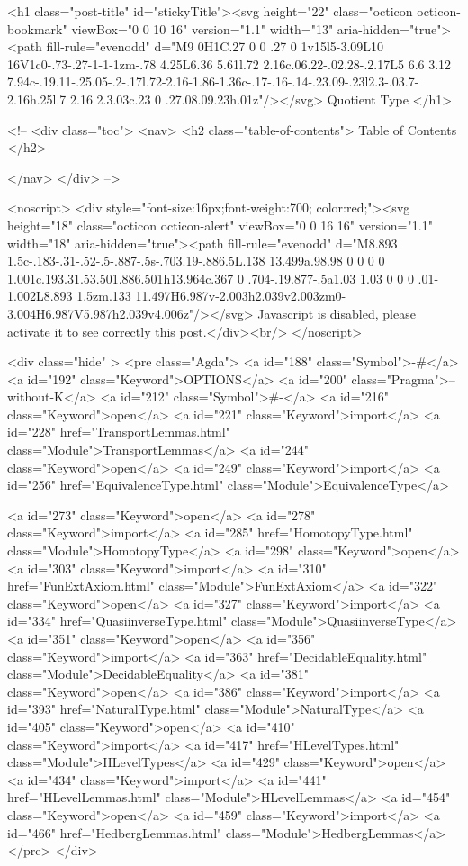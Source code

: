   <h1 class="post-title" id="stickyTitle"><svg height="22" class="octicon octicon-bookmark" viewBox="0 0 10 16" version="1.1" width="13" aria-hidden="true"><path fill-rule="evenodd" d="M9 0H1C.27 0 0 .27 0 1v15l5-3.09L10 16V1c0-.73-.27-1-1-1zm-.78 4.25L6.36 5.61l.72 2.16c.06.22-.02.28-.2.17L5 6.6 3.12 7.94c-.19.11-.25.05-.2-.17l.72-2.16-1.86-1.36c-.17-.16-.14-.23.09-.23l2.3-.03.7-2.16h.25l.7 2.16 2.3.03c.23 0 .27.08.09.23h.01z"/></svg> Quotient Type
  </h1>

  <!-- 
  <div class="toc">
    <nav>
    <h2 class="table-of-contents"> Table of Contents </h2>
      

    </nav>
  </div>
   -->

  <noscript>
  <div style="font-size:16px;font-weight:700; color:red;"><svg height="18" class="octicon octicon-alert" viewBox="0 0 16 16" version="1.1" width="18" aria-hidden="true"><path fill-rule="evenodd" d="M8.893 1.5c-.183-.31-.52-.5-.887-.5s-.703.19-.886.5L.138 13.499a.98.98 0 0 0 0 1.001c.193.31.53.501.886.501h13.964c.367 0 .704-.19.877-.5a1.03 1.03 0 0 0 .01-1.002L8.893 1.5zm.133 11.497H6.987v-2.003h2.039v2.003zm0-3.004H6.987V5.987h2.039v4.006z"/></svg> Javascript is disabled, please activate it to see correctly this post.</div><br/>
  </noscript>

  <div class="hide" >
<pre class="Agda">
<a id="188" class="Symbol">{-#</a> <a id="192" class="Keyword">OPTIONS</a> <a id="200" class="Pragma">--without-K</a> <a id="212" class="Symbol">#-}</a>
<a id="216" class="Keyword">open</a> <a id="221" class="Keyword">import</a> <a id="228" href="TransportLemmas.html" class="Module">TransportLemmas</a>
<a id="244" class="Keyword">open</a> <a id="249" class="Keyword">import</a> <a id="256" href="EquivalenceType.html" class="Module">EquivalenceType</a>

<a id="273" class="Keyword">open</a> <a id="278" class="Keyword">import</a> <a id="285" href="HomotopyType.html" class="Module">HomotopyType</a>
<a id="298" class="Keyword">open</a> <a id="303" class="Keyword">import</a> <a id="310" href="FunExtAxiom.html" class="Module">FunExtAxiom</a>
<a id="322" class="Keyword">open</a> <a id="327" class="Keyword">import</a> <a id="334" href="QuasiinverseType.html" class="Module">QuasiinverseType</a>
<a id="351" class="Keyword">open</a> <a id="356" class="Keyword">import</a> <a id="363" href="DecidableEquality.html" class="Module">DecidableEquality</a>
<a id="381" class="Keyword">open</a> <a id="386" class="Keyword">import</a> <a id="393" href="NaturalType.html" class="Module">NaturalType</a>
<a id="405" class="Keyword">open</a> <a id="410" class="Keyword">import</a> <a id="417" href="HLevelTypes.html" class="Module">HLevelTypes</a>
<a id="429" class="Keyword">open</a> <a id="434" class="Keyword">import</a> <a id="441" href="HLevelLemmas.html" class="Module">HLevelLemmas</a>
<a id="454" class="Keyword">open</a> <a id="459" class="Keyword">import</a> <a id="466" href="HedbergLemmas.html" class="Module">HedbergLemmas</a>
</pre>
</div>


